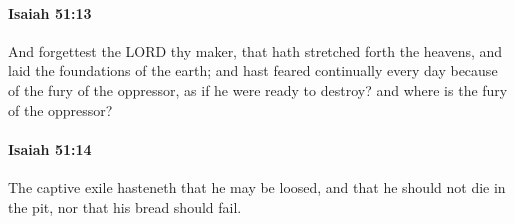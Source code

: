 		\paragraph{Isaiah 51:13} %
			\label{ISAIAH-51-13}

			And forgettest the LORD thy maker, that hath stretched forth the heavens, and laid the foundations of the earth; and hast feared continually every day because of the fury of the oppressor, as if he were ready to destroy? and where is the fury of the oppressor?


		\paragraph{Isaiah 51:14} %
			\label{ISAIAH-51-14}

			The captive exile hasteneth that he may be loosed, and that he should not die in the pit, nor that his bread should fail.

